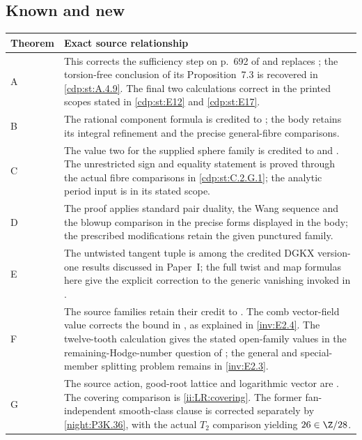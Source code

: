 \subsection{Known and new}
\begingroup\small
\begin{longtable}{@{}p{}p{}@{}}\toprule Theorem & Exact source relationship\\\midrule\endhead
A & This corrects the sufficiency step
on p.~692 of \cite{CDP2020} and replaces
\cite[Theorem~2.2]{CDP2020}; the torsion-free conclusion of its
Proposition~7.3 is recovered in \ref{cdp:st:A.4.9}.
The final two calculations correct \cite[Lemma~1.5 and
Proposition~1.1]{CDP98} in the printed scopes stated in
\ref{cdp:st:E12} and \ref{cdp:st:E17}.\\
B & The rational component formula is
credited to \cite[\S10.5, p.~91]{AC2026}; the body retains its
integral refinement and the precise general-fibre comparisons.\\
C & The value two for the supplied
sphere family is credited to \cite[Theorem~7.22, p.~60]{AC26}
and \cite[Proposition~7.1]{Engel2026}. The unrestricted sign and
equality statement is proved through the actual fibre comparisons
in \ref{cdp:st:C.2.G.1}; the analytic period input is
\cite[\S2, pp.~234--239]{Steenbrink1976} in its stated scope.\\
D & The proof applies standard pair
duality, the Wang sequence and the blowup comparison in the precise
forms displayed in the body; the prescribed modifications retain
the given punctured family.\\
E & The untwisted tangent tuple is
among the credited DGKX version-one results discussed in Paper~I;
the full twist and map formulas here give the explicit correction
to the generic vanishing invoked in \cite[Theorem~2.2]{CDP2020}.\\
F & The source families retain their
credit to \cite{Viaclovsky2026Two,LiuRollenske2026,Viaclovsky2026Combs}.
The comb vector-field value corrects the bound in
\cite[Corollary~1.3, p.~2]{HKP2000}, as explained in
\ref{inv:E2.4}.
The twelve-tooth calculation gives the stated open-family values
in the remaining-Hodge-number question of
\cite[Section~10(2)]{Viaclovsky2026Combs}; the general and
special-member splitting problem remains in \ref{inv:E2.3}.\\
G & The source action, good-root
lattice and logarithmic vector are
\cite[Lemma~2.7, Corollary~2.8, pp.~6--7; Proposition~3.6 and
Definition~3.7, pp.~9--10 of the attached-source edition]{LiuRollenske2026}.
The covering comparison is \ref{ii:LR:covering}. The former
fan-independent smooth-class clause is corrected separately by
\ref{night:P3K.36}, with the actual $T_2$ comparison yielding
$26\in\Z/28$.\\
\bottomrule\end{longtable}\endgroup

